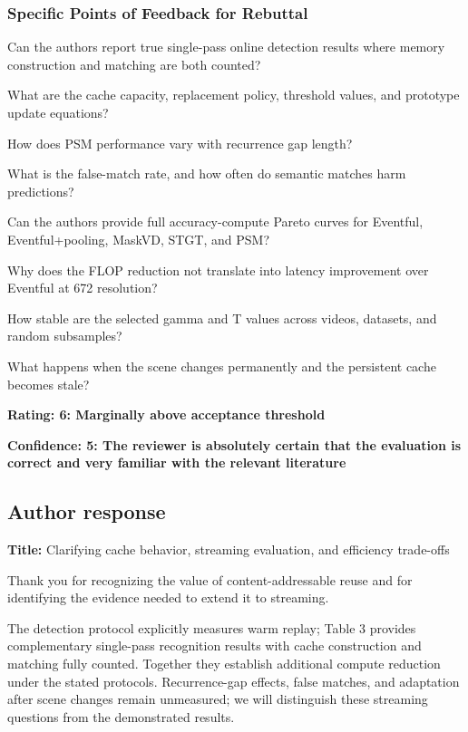 \documentclass[11pt]{article}
\begin{document}
\subsubsection*{Specific Points of Feedback for Rebuttal}
Can the authors report true single-pass online detection results where memory construction and matching are both counted?

What are the cache capacity, replacement policy, threshold values, and prototype update equations?

How does PSM performance vary with recurrence gap length?

What is the false-match rate, and how often do semantic matches harm predictions?

Can the authors provide full accuracy-compute Pareto curves for Eventful, Eventful+pooling, MaskVD, STGT, and PSM?

Why does the FLOP reduction not translate into latency improvement over Eventful at 672 resolution?

How stable are the selected gamma and T values across videos, datasets, and random subsamples?

What happens when the scene changes permanently and the persistent cache becomes stale?

\noindent\textbf{Rating: 6: Marginally above acceptance threshold}\par
\noindent\textbf{Confidence: 5: The reviewer is absolutely certain that the evaluation is correct and very familiar with the relevant literature}\par

\subsection{Author response}

\textbf{Title:} Clarifying cache behavior, streaming evaluation, and efficiency trade-offs

Thank you for recognizing the value of content-addressable reuse and for identifying the evidence needed to extend it to streaming.

The detection protocol explicitly measures warm replay; Table 3 provides complementary single-pass recognition results with cache construction and matching fully counted. Together they establish additional compute reduction under the stated protocols. Recurrence-gap effects, false matches, and adaptation after scene changes remain unmeasured; we will distinguish these streaming questions from the demonstrated results.
\end{document}
